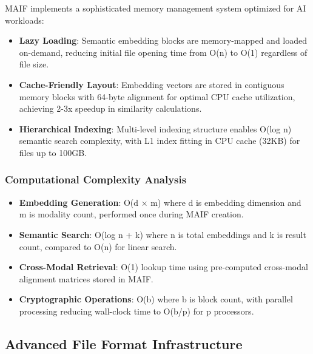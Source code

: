 \documentclass[conference]{IEEEtran}
\begin{document}
MAIF implements a sophisticated memory management system optimized for AI workloads:

\begin{itemize}[leftmargin=*]
\item \textbf{Lazy Loading}: Semantic embedding blocks are memory-mapped and loaded on-demand, reducing initial file opening time from O(n) to O(1) regardless of file size.
\item \textbf{Cache-Friendly Layout}: Embedding vectors are stored in contiguous memory blocks with 64-byte alignment for optimal CPU cache utilization, achieving 2-3x speedup in similarity calculations.
\item \textbf{Hierarchical Indexing}: Multi-level indexing structure enables O(log n) semantic search complexity, with L1 index fitting in CPU cache (32KB) for files up to 100GB.
\end{itemize}

\subsubsection{Computational Complexity Analysis}

\begin{itemize}[leftmargin=*]
\item \textbf{Embedding Generation}: O(d × m) where d is embedding dimension and m is modality count, performed once during MAIF creation.
\item \textbf{Semantic Search}: O(log n + k) where n is total embeddings and k is result count, compared to O(n) for linear search.
\item \textbf{Cross-Modal Retrieval}: O(1) lookup time using pre-computed cross-modal alignment matrices stored in MAIF.
\item \textbf{Cryptographic Operations}: O(b) where b is block count, with parallel processing reducing wall-clock time to O(b/p) for p processors.
\end{itemize}

\subsection{Advanced File Format Infrastructure}
\end{document}
